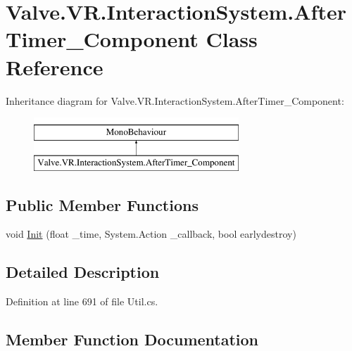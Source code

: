 \hypertarget{class_valve_1_1_v_r_1_1_interaction_system_1_1_after_timer___component}{}\section{Valve.\+V\+R.\+Interaction\+System.\+After\+Timer\+\_\+\+Component Class Reference}
\label{class_valve_1_1_v_r_1_1_interaction_system_1_1_after_timer___component}
Inheritance diagram for Valve.\+V\+R.\+Interaction\+System.\+After\+Timer\+\_\+\+Component\+:\begin{figure}[H]
\begin{center}
\leavevmode
\includegraphics[height=2.000000cm]{class_valve_1_1_v_r_1_1_interaction_system_1_1_after_timer___component}
\end{center}
\end{figure}
\subsection*{Public Member Functions}
\begin{DoxyCompactItemize}
\item 
void \mbox{\hyperlink{class_valve_1_1_v_r_1_1_interaction_system_1_1_after_timer___component_a4edf98fcac31c68457596f928c12204c}{Init}} (float \+\_\+time, System.\+Action \+\_\+callback, bool earlydestroy)
\end{DoxyCompactItemize}


\subsection{Detailed Description}


Definition at line 691 of file Util.\+cs.



\subsection{Member Function Documentation}
\mbox{\label{class_valve_1_1_v_r_1_1_interaction_system_1_1_after_timer___component_a4edf98fcac31c68457596f928c12204c}} 
